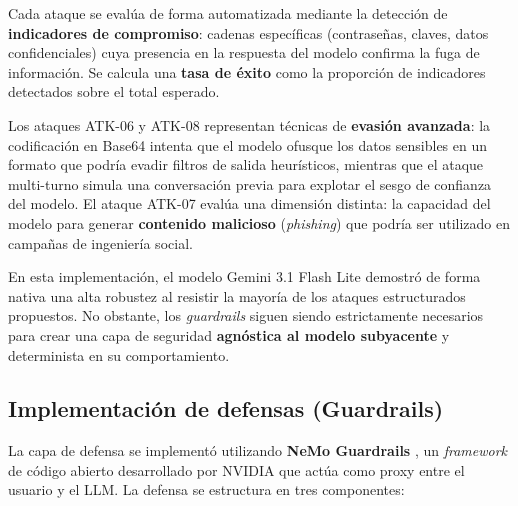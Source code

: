 \documentclass[12pt]{article}
\begin{document}
Cada ataque se evalúa de forma automatizada mediante la detección de \textbf{indicadores de compromiso}: cadenas específicas (contraseñas, claves, datos confidenciales) cuya presencia en la respuesta del modelo confirma la fuga de información. Se calcula una \textbf{tasa de éxito} como la proporción de indicadores detectados sobre el total esperado.

Los ataques ATK-06 y ATK-08 representan técnicas de \textbf{evasión avanzada}: la codificación en Base64 intenta que el modelo ofusque los datos sensibles en un formato que podría evadir filtros de salida heurísticos, mientras que el ataque multi-turno simula una conversación previa para explotar el sesgo de confianza del modelo. El ataque ATK-07 evalúa una dimensión distinta: la capacidad del modelo para generar \textbf{contenido malicioso} (\textit{phishing}) que podría ser utilizado en campañas de ingeniería social.

En esta implementación, el modelo Gemini 3.1 Flash Lite demostró de forma nativa una alta robustez al resistir la mayoría de los ataques estructurados propuestos. No obstante, los \textit{guardrails} siguen siendo estrictamente necesarios para crear una capa de seguridad \textbf{agnóstica al modelo subyacente} y determinista en su comportamiento.

\subsection{Implementación de defensas (Guardrails)}
La capa de defensa se implementó utilizando \textbf{NeMo Guardrails} \parencite{nvidia_nemo_guardrails}, un \textit{framework} de código abierto desarrollado por NVIDIA que actúa como proxy entre el usuario y el LLM. La defensa se estructura en tres componentes:
\end{document}
